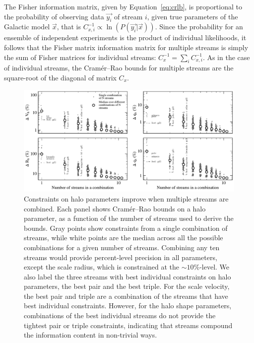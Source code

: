 \documentclass[modern]{aastex61}
\begin{document}
The Fisher information matrix, given by Equation~\ref{eq:crlb}, is proportional to the probability of observing data $\vec{y_i}$ of stream $i$, given true parameters of the Galactic model $\vec{x}$, that is $C_{x,i}^{-1}\propto \ln(P(\vec{y_i}|\vec{x}))$.
Since the probability for an ensemble of independent experiments is the product of individual likelihoods, it follows that the Fisher matrix information matrix for multiple streams is simply the sum of Fisher matrices for individual streams: $C_x^{-1} = \sum_{i} C_{x,i}^{-1}$.
As in the case of individual streams, the Cram\' er--Rao bounds for multiple streams are the square-root of the diagonal of matrix $C_x$.

\begin{figure}
\begin{center}
\includegraphics[width=\textwidth]{nstream_improvement.pdf}
\caption{Constraints on halo parameters improve when multiple streams are combined.
Each panel shows Cram\'er--Rao bounds on a halo parameter, as a function of the number of streams used to derive the bounds.
Gray points show constraints from a single combination of streams, while white points are the median across all the possible combinations for a given number of streams.
Combining any ten streams would provide percent-level precision in all parameters, except the scale radius, which is constrained at the $\sim10\%$-level.
We also label the three streams with best individual constraints on halo parameters, the best pair and the best triple.
For the scale velocity, the best pair and triple are a combination of the streams that have best individual constraints.
However, for the halo shape parameters, combinations of the best individual streams do not provide the tightest pair or triple constraints, indicating that streams compound the information content in non-trivial ways.
}
\label{fig:nstream_summary}
\end{center}
\end{figure}
\end{document}
